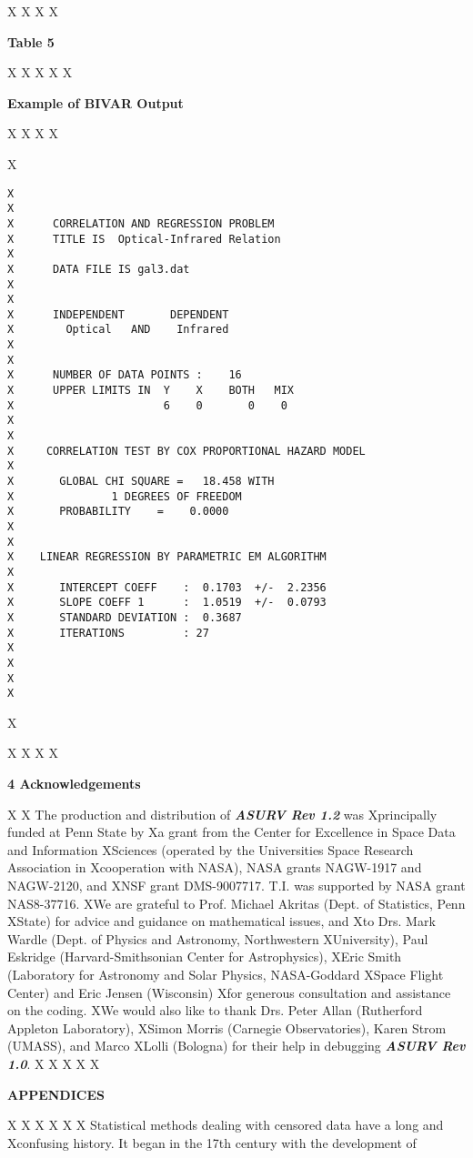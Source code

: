 X\newpage
X
X
X\centerline{\Large\bf Table 5}
X
X\bigskip 
X\bigskip 
X
X\centerline{\large\bf Example of BIVAR Output}
X
X\bigskip
X
X\begin{center}
X\begin{verbatim}
X
X     
X      CORRELATION AND REGRESSION PROBLEM
X      TITLE IS  Optical-Infrared Relation                                                       
X     
X      DATA FILE IS gal3.dat 
X     
X     
X      INDEPENDENT       DEPENDENT
X        Optical   AND    Infrared
X     
X     
X      NUMBER OF DATA POINTS :    16
X      UPPER LIMITS IN  Y    X    BOTH   MIX
X                       6    0       0    0
X     
X    
X     CORRELATION TEST BY COX PROPORTIONAL HAZARD MODEL
X    
X       GLOBAL CHI SQUARE =   18.458 WITH 
X               1 DEGREES OF FREEDOM
X       PROBABILITY    =    0.0000
X    
X          
X    LINEAR REGRESSION BY PARAMETRIC EM ALGORITHM
X          
X       INTERCEPT COEFF    :  0.1703  +/-  2.2356
X       SLOPE COEFF 1      :  1.0519  +/-  0.0793
X       STANDARD DEVIATION :  0.3687
X       ITERATIONS         : 27
X          
X
X
X\end{verbatim}
X\end{center}
X 
X\newpage
X
X\centerline{\Large\bf 4  Acknowledgements}
X 
X     The production and distribution of {\sl\bf ASURV Rev 1.2} was 
Xprincipally funded at Penn State by 
Xa grant from the Center for Excellence in Space Data and Information
XSciences (operated by the Universities Space Research Association in
Xcooperation with NASA), NASA grants NAGW-1917 and NAGW-2120, and
XNSF grant DMS-9007717. T.I. was supported by NASA grant NAS8-37716.
XWe are grateful to Prof. Michael Akritas (Dept. of Statistics, Penn 
XState) for advice and guidance on mathematical issues, and
Xto Drs. Mark Wardle (Dept. of Physics and Astronomy, Northwestern
XUniversity), Paul Eskridge (Harvard-Smithsonian Center for Astrophysics),
XEric Smith (Laboratory for Astronomy and Solar Physics, NASA-Goddard
XSpace Flight Center) and Eric Jensen (Wisconsin)
Xfor generous consultation and assistance on the coding.
XWe would also like to thank Drs. Peter Allan (Rutherford Appleton Laboratory),
XSimon Morris (Carnegie Observatories), Karen Strom (UMASS), and Marco
XLolli (Bologna) for their help in debugging {\sl\bf ASURV Rev 1.0}.
X
X\newpage
X
X\bigskip
X\centerline{\Large\bf APPENDICES}
X
X\bigskip
X\bigskip
X
X  
X     Statistical methods dealing with censored data have a long and
Xconfusing history.  It began in the 17th century with the development of
